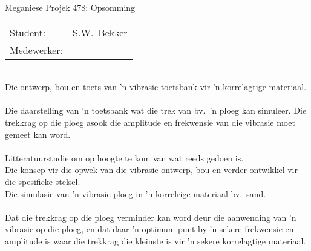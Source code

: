 
\begin{Summary}{Meganiese Projek 478: Opsomming}

   \noindent
   \begin{tabular}{@{}ll@{}}
      \textsf{Student:}    &  S.W.\ Bekker\\
      \textsf{Medewerker:} &
   \end{tabular}

\begin{SumTable}
 \hline%
 \\
 \hline%
    Die ontwerp, bou en toets van 'n vibrasie toetsbank vir 'n
    korrelagtige materiaal.\\

 \hline%
 \\
 \hline%
    Die daarstelling van 'n toetsbank wat die trek van bv.\ 'n
    ploeg kan simuleer. Die trekkrag op die ploeg asook die
    amplitude en frekwensie van die vibrasie moet gemeet kan
    word.\\

 \hline%
 \\
 \hline%
    Litteratuurstudie om op hoogte te kom van wat reeds gedoen
    is.\\

    Die konsep vir die opwek van die vibrasie ontwerp, bou en
    verder ontwikkel vir die spesifieke stelsel.\\

    Die simulasie van 'n vibrasie ploeg in 'n korrelrige materiaal
    bv.\ sand.\\

 \hline%
 \\
 \hline%
    Dat die trekkrag op die ploeg verminder kan word deur die
    aanwending van 'n vibrasie op die ploeg, en dat daar 'n
    optimum punt by 'n sekere frekwensie en amplitude is waar die
    trekkrag die kleinste is vir 'n sekere korrelagtige materiaal.\\


\end{SumTable}
\end{Summary}
